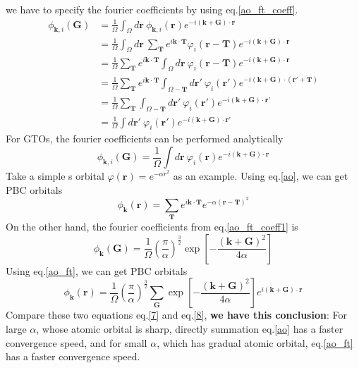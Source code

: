 \documentclass{article}
\begin{document}
    we have to specify the fourier coefficients by using eq.\eqref{ao_ft_coeff}.
    \begin{align*}
        \phi_{\textbf{k},i}(\textbf{G}) &= \frac{1}{\Omega}\int_\Omega d\textbf{r}\ \phi_{\textbf{k},i}(\textbf{r})e^{-i(\textbf{k}+\textbf{G})\cdot\textbf{r}}\\
        &= \frac{1}{\Omega}\int_\Omega d\textbf{r}\ \sum_{\textbf{T}}e^{i\textbf{k}\cdot\textbf{T}}\varphi_i(\textbf{r}-\textbf{T})e^{-i(\textbf{k}+\textbf{G})\cdot\textbf{r}}\\
        &= \frac{1}{\Omega}\sum_{\textbf{T}}e^{i\textbf{k}\cdot\textbf{T}}\int_\Omega d\textbf{r}\ \varphi_i(\textbf{r}-\textbf{T})e^{-i(\textbf{k}+\textbf{G})\cdot\textbf{r}}\\
        &= \frac{1}{\Omega}\sum_{\textbf{T}}e^{i\textbf{k}\cdot\textbf{T}}\int_{\Omega-\textbf{T}} d\textbf{r}'\ \varphi_i(\textbf{r}')e^{-i(\textbf{k}+\textbf{G})\cdot(\textbf{r}'+\textbf{T})}\\
        &= \frac{1}{\Omega}\sum_{\textbf{T}}\int_{\Omega-\textbf{T}} d\textbf{r}'\ \varphi_i(\textbf{r}')e^{-i(\textbf{k}+\textbf{G})\cdot\textbf{r}'}\\
        &= \frac{1}{\Omega}\int d\textbf{r}'\ \varphi_i(\textbf{r}')e^{-i(\textbf{k}+\textbf{G})\cdot\textbf{r}'}
    \end{align*}
    For GTOs, the fourier coefficients can be performed analytically
    \begin{equation}
        \phi_{\textbf{k},i}(\textbf{G}) = \frac{1}{\Omega}\int d\textbf{r}\ \varphi_i(\textbf{r})e^{-i(\textbf{k}+\textbf{G})\cdot\textbf{r}}\label{ao_ft_coeff1}
    \end{equation}
    Take a simple s orbital $\varphi(\textbf{r})=e^{-\alpha r^2}$ as an example.
    Using eq.\eqref{ao}, we can get PBC orbitals
    \begin{equation}
        \phi_{\textbf{k}}(\textbf{r}) = \sum_{\textbf{T}}e^{i\textbf{k}\cdot\textbf{T}}e^{-\alpha (\textbf{r}-\textbf{T})^2}\label{7}
    \end{equation}
    On the other hand, the fourier coefficients from eq.\eqref{ao_ft_coeff1} is
    \begin{equation*}
        \phi_{\textbf{k}}(\textbf{G}) = \frac{1}{\Omega}\left(\frac{\pi}{\alpha}\right)^{\frac{3}{2}}\exp\left[-\frac{(\textbf{k}+\textbf{G})^2}{4\alpha}\right]
    \end{equation*}
    Using eq.\eqref{ao_ft}, we can get PBC orbitals
    \begin{equation}
        \phi_{\textbf{k}}(\textbf{r}) = \frac{1}{\Omega}\left(\frac{\pi}{\alpha}\right)^{\frac{3}{2}}\sum_{\textbf{G}}\exp\left[-\frac{(\textbf{k}+\textbf{G})^2}{4\alpha}\right]e^{i(\textbf{k}+\textbf{G})\cdot\textbf{r}}\label{8}
    \end{equation}
    Compare these two equations eq.\eqref{7} and eq.\eqref{8}, \textbf{we have this conclusion}:
    For large $\alpha$, whose atomic orbital is sharp, directly summation eq.\eqref{ao} has a faster convergence speed,
    and for small $\alpha$, which has gradual atomic orbital, eq.\eqref{ao_ft} has a faster convergence speed.
    
\end{document}
